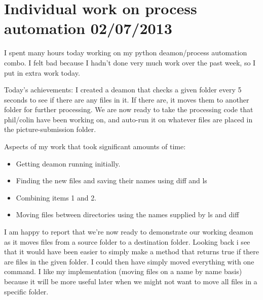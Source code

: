 \documentclass[]{article}
\begin{document}
	\tableofcontents
	\newpage
	
	\section{Individual work on process automation 02/07/2013}
	
	I spent many hours today working on my python deamon/process automation combo. I felt bad because I hadn't done very much work over the past week, so I put in extra work today.
	
	Today's achievements: I created a deamon that checks a given folder every 5 seconds to see if there are any files in it. If there are, it moves them to another folder for further processing. We are now ready to take the processing code that phil/colin have been working on, and auto-run it on whatever files are placed in the picture-submission folder.
	
	Aspects of my work that took significant amounts of time:
	
	\begin{itemize}
					\item Getting deamon running initially.
					\item Finding the new files and saving their names using diff and ls
					\item Combining items 1 and 2.
					\item Moving files between directories using the names supplied by ls and diff
	\end{itemize}
		
	I am happy to report that we're now ready to demonstrate our working deamon as it moves files from a source folder to a destination folder.
	Looking back i see that it would have been easier to simply make a method that returns true if there are files in the given folder. I could then have simply moved everything with one command. I like my implementation (moving files on a name by name basis) because it will be more useful later when we might not want to move all files in a specific folder.	
	
\end{document}
